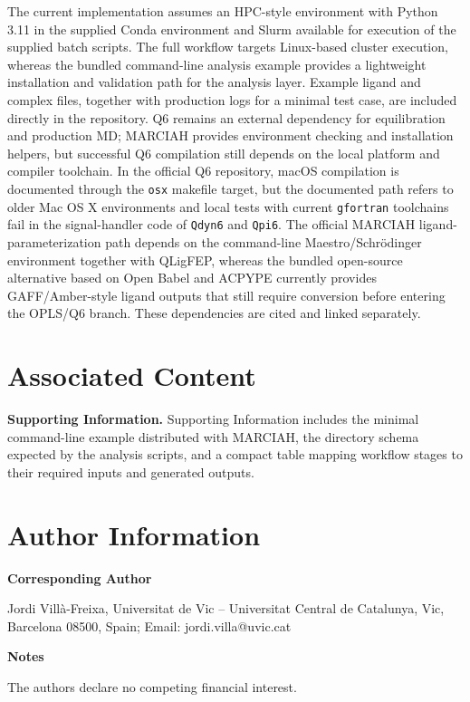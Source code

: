 \documentclass[journal=jcisd8,manuscript=article]{achemso}
\begin{document}
The current implementation assumes an HPC-style environment with Python 3.11 in the supplied Conda environment and Slurm available for execution of the supplied batch scripts. The full workflow targets Linux-based cluster execution, whereas the bundled command-line analysis example provides a lightweight installation and validation path for the analysis layer. Example ligand and complex files, together with production logs for a minimal test case, are included directly in the repository. Q6 remains an external dependency for equilibration and production MD; MARCIAH provides environment checking and installation helpers, but successful Q6 compilation still depends on the local platform and compiler toolchain. In the official Q6 repository, macOS compilation is documented through the \texttt{osx} makefile target, but the documented path refers to older Mac OS X environments and local tests with current \texttt{gfortran} toolchains fail in the signal-handler code of \texttt{Qdyn6} and \texttt{Qpi6}. The official MARCIAH ligand-parameterization path depends on the command-line Maestro/Schr\"odinger environment together with QLigFEP, whereas the bundled open-source alternative based on Open Babel and ACPYPE currently provides GAFF/Amber-style ligand outputs that still require conversion before entering the OPLS/Q6 branch. These dependencies are cited and linked separately.\cite{bauer2018q6,q6repo,qligfeprepo}

\section{Associated Content}

\textbf{Supporting Information.} Supporting Information includes the minimal command-line example distributed with MARCIAH, the directory schema expected by the analysis scripts, and a compact table mapping workflow stages to their required inputs and generated outputs.

\section{Author Information}

\textbf{Corresponding Author}

Jordi Vill\`a-Freixa, Universitat de Vic -- Universitat Central de Catalunya, Vic, Barcelona 08500, Spain; Email: jordi.villa@uvic.cat

\textbf{Notes}

The authors declare no competing financial interest.
\end{document}
